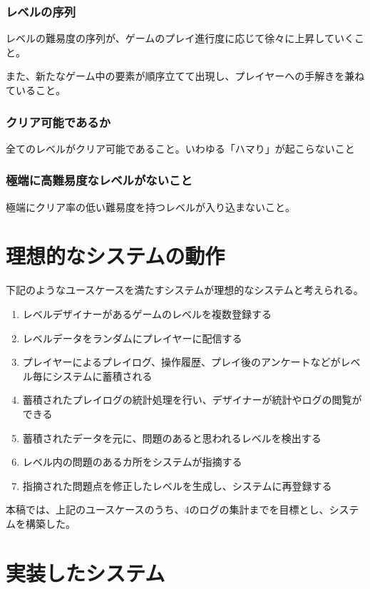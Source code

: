 \subsubsection{レベルの序列}
レベルの難易度の序列が、ゲームのプレイ進行度に応じて徐々に上昇していくこと。

また、新たなゲーム中の要素が順序立てて出現し、プレイヤーへの手解きを兼ねていること。

\subsubsection{クリア可能であるか}
全てのレベルがクリア可能であること。いわゆる「ハマり」が起こらないこと

\subsubsection{極端に高難易度なレベルがないこと}
極端にクリア率の低い難易度を持つレベルが入り込まないこと。

\section{理想的なシステムの動作}
下記のようなユースケースを満たすシステムが理想的なシステムと考えられる。

\begin{enumerate}
  \item レベルデザイナーがあるゲームのレベルを複数登録する
  \item レベルデータをランダムにプレイヤーに配信する
  \item プレイヤーによるプレイログ、操作履歴、プレイ後のアンケートなどがレベル毎にシステムに蓄積される
  \item 蓄積されたプレイログの統計処理を行い、デザイナーが統計やログの閲覧ができる
  \item 蓄積されたデータを元に、問題のあると思われるレベルを検出する
  \item レベル内の問題のあるカ所をシステムが指摘する
  \item 指摘された問題点を修正したレベルを生成し、システムに再登録する
\end{enumerate}

本稿では、上記のユースケースのうち、4のログの集計までを目標とし、システムを構築した。

\section{実装したシステム}

